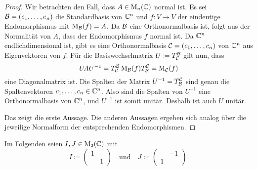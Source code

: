 \documentclass[a4paper, 10pt, numbers=noenddot]{scrartcl}
\begin{document}
\begin{proof}
  Wir betrachten den Fall, dass $A \in \operatorname{M}_n(\mathbb{C})$ normal ist.
  Es sei $\mathcal{B} = (e_1, \dotsc, e_n)$ die Standardbasis von $\mathbb{C}^n$ und $f \colon V \to V$ der eindeutige Endomorphismus mit $\operatorname{M}_{\mathcal{B}}(f) = A$.
  Da $\mathcal{B}$ eine Orthonormalbasis ist, folgt aus der Normalität von $A$, dass der Endomorphismus $f$ normal ist.
  Da $\mathbb{C}^n$ endlichdimensional ist, gibt es eine Orthonormalbasis $\mathcal{C} = (c_1, \dotsc, c_n)$ von $\mathbb{C}^n$ aus Eigenvektoren von $f$.
  Für die Basiswechselmatrix $U \coloneqq T^{\mathcal{B}}_{\mathcal{C}}$ gilt nun, dass
  \[
      U \! A U^{-1}
    = T^{\mathcal{B}}_{\mathcal{C}} \operatorname{M}_{\mathcal{B}}(f) T^{\mathcal{C}}_{\mathcal{B}}
    = \operatorname{M}_{\mathcal{C}}(f)
  \]
  eine Diagonalmatrix ist.
  Die Spalten der Matrix $U^{-1} = T^{\mathcal{C}}_{\mathcal{B}}$ sind genau die Spaltenvektoren $c_1, \dotsc, c_n \in \mathbb{C}^n$.
  Also sind die Spalten von $U^{-1}$ eine Orthonormalbasis von $\mathbb{C}^n$, und $U^{-1}$ ist somit unitär.
  Deshalb ist auch $U$ unitär.
  
  Das zeigt die erste Aussage.
  Die anderen Aussagen ergeben sich analog über die jeweilige Normalform der entsprechenden Endomorphismen.
\end{proof}


Im Folgenden seien $I, J \in \operatorname{M}_2(\mathbb{C})$ mit
\[
  I \coloneqq
  \begin{pmatrix}
    1 &   \\
      & 1
  \end{pmatrix}
  \quad\text{und}\quad
  J \coloneqq
  \begin{pmatrix}
      & -1  \\
    1 & 
  \end{pmatrix}.
\]
\end{document}
